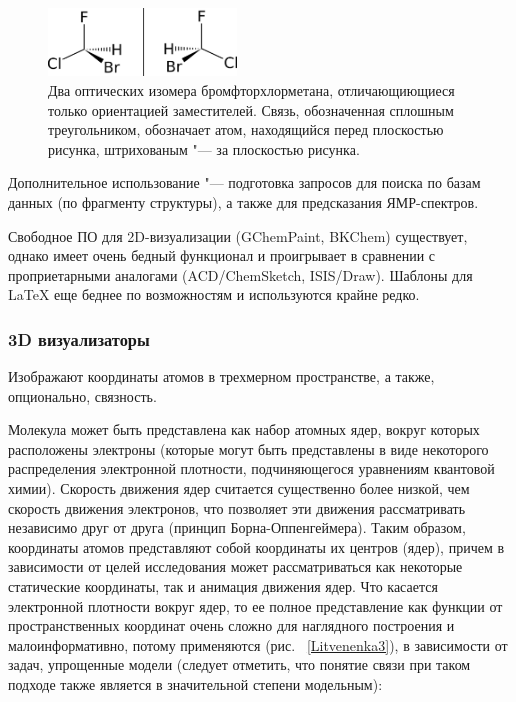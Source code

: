 \documentclass[10pt, a5paper]{article}
\begin{document}
\begin{figure}[h!]
  \centering
  \includegraphics[width=5cm]{20_2016_Litvenenka2.png}
  \caption{Два оптических изомера бромфторхлорметана, отличающиющиеся только ориентацией заместителей. Связь, обозначенная сплошным треугольником, обозначает атом, находящийся перед плоскостью рисунка, штрихованым "--- за плоскостью рисунка.}
  \label{Litvenenka2}
\end{figure}

Дополнительное использование "--- подготовка запросов для поиска по базам данных (по фрагменту структуры), а также для предсказания ЯМР-спектров.

Свободное ПО для 2D-визуализации (GChemPaint, BKChem) существует, однако имеет очень бедный функционал и проигрывает в сравнении с проприетарными аналогами (ACD/ChemSketch, ISIS/Draw). Шаблоны для LaTeX еще беднее по возможностям и используются крайне редко.

\subsubsection*{3D визуализаторы}

Изображают координаты атомов в трехмерном пространстве, а также, опционально, связность.

Молекула может быть представлена как набор атомных ядер, вокруг которых расположены электроны (которые могут быть представлены в виде некоторого распределения электронной плотности, подчиняющегося уравнениям квантовой химии). Скорость движения ядер считается существенно более низкой, чем скорость движения электронов, что позволяет эти движения рассматривать независимо друг от друга (принцип Борна-Оппенгеймера). Таким образом, координаты атомов представляют собой координаты их центров (ядер), причем в зависимости от целей исследования может рассматриваться как некоторые статические координаты, так и анимация движения ядер. Что касается электронной плотности вокруг ядер, то ее полное представление как функции от пространственных координат очень сложно для наглядного построения и малоинформативно, потому применяются (рис. ~\ref{Litvenenka3}), в зависимости от задач, упрощенные модели (следует отметить, что понятие связи при таком подходе также является в значительной степени модельным):
\end{document}
